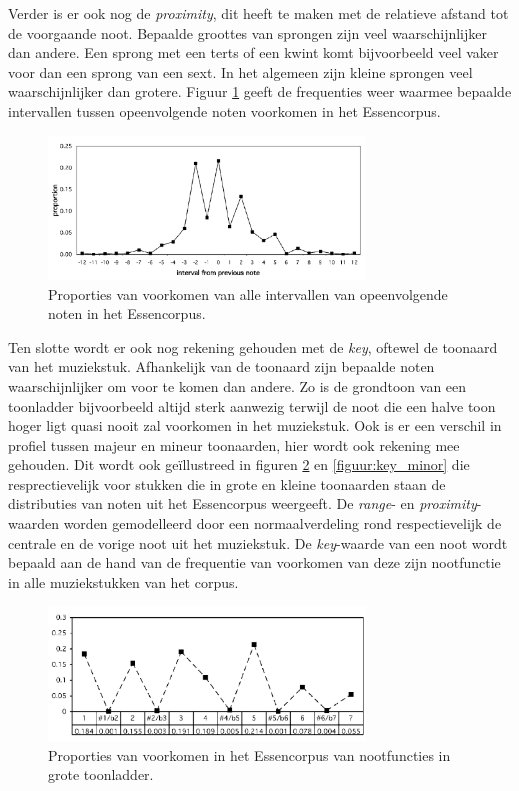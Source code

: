 Verder is er ook nog de \textit{proximity}, dit heeft te maken met de relatieve afstand tot de voorgaande noot. Bepaalde groottes van sprongen zijn veel waarschijnlijker dan andere. Een sprong met een terts of een kwint komt bijvoorbeeld veel vaker voor dan een sprong van een sext. In het algemeen zijn kleine sprongen veel waarschijnlijker dan grotere. Figuur \ref{figuur:proximity} geeft de frequenties weer waarmee bepaalde intervallen tussen opeenvolgende noten voorkomen in het Essencorpus. \\

\begin{figure}[!ht]
  \centering
  \includegraphics[width=0.75\textwidth]{2_Objectieve_Beoordeling/proximity}
  \caption{Proporties van voorkomen van alle intervallen van opeenvolgende noten in het Essencorpus.}
  \label{figuur:proximity}
\end{figure}

Ten slotte wordt er ook nog rekening gehouden met de \textit{key}, oftewel de toonaard van het muziekstuk. Afhankelijk van de toonaard zijn bepaalde noten waarschijnlijker om voor te komen dan andere. Zo is de grondtoon van een toonladder bijvoorbeeld altijd sterk aanwezig terwijl de noot die een halve toon hoger ligt quasi nooit zal voorkomen in het muziekstuk. Ook is er een verschil in profiel tussen majeur en mineur toonaarden, hier wordt ook rekening mee gehouden. Dit wordt ook ge\"illustreed in figuren \ref{figuur:key_major} en \ref{figuur:key_minor} die resprectievelijk voor stukken die in grote en kleine toonaarden staan de distributies van noten uit het Essencorpus weergeeft. De \textit{range}- en \textit{proximity}-waarden worden gemodelleerd door een normaalverdeling rond respectievelijk de centrale en de vorige noot uit het muziekstuk. De \textit{key}-waarde van een noot wordt bepaald aan de hand van de frequentie van voorkomen van deze zijn nootfunctie in alle muziekstukken van het corpus.\\

\begin{figure}[!ht]
  \centering
  \includegraphics[width=0.75\textwidth]{2_Objectieve_Beoordeling/key_major}
  \caption{Proporties van voorkomen in het Essencorpus van nootfuncties in grote toonladder.}
  \label{figuur:key_major}
\end{figure}

